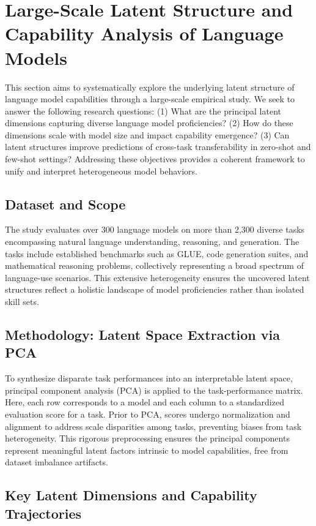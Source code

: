 \documentclass[sigconf]{acmart}
\begin{document}
\section{Large-Scale Latent Structure and Capability Analysis of Language Models}

This section aims to systematically explore the underlying latent structure of language model capabilities through a large-scale empirical study. We seek to answer the following research questions: (1) What are the principal latent dimensions capturing diverse language model proficiencies? (2) How do these dimensions scale with model size and impact capability emergence? (3) Can latent structures improve predictions of cross-task transferability in zero-shot and few-shot settings? Addressing these objectives provides a coherent framework to unify and interpret heterogeneous model behaviors.

\subsection{Dataset and Scope}

The study evaluates over 300 language models on more than 2,300 diverse tasks encompassing natural language understanding, reasoning, and generation. The tasks include established benchmarks such as GLUE, code generation suites, and mathematical reasoning problems, collectively representing a broad spectrum of language-use scenarios. This extensive heterogeneity ensures the uncovered latent structures reflect a holistic landscape of model proficiencies rather than isolated skill sets.

\subsection{Methodology: Latent Space Extraction via PCA}

To synthesize disparate task performances into an interpretable latent space, principal component analysis (PCA) is applied to the task-performance matrix. Here, each row corresponds to a model and each column to a standardized evaluation score for a task. Prior to PCA, scores undergo normalization and alignment to address scale disparities among tasks, preventing biases from task heterogeneity. This rigorous preprocessing ensures the principal components represent meaningful latent factors intrinsic to model capabilities, free from dataset imbalance artifacts.

\subsection{Key Latent Dimensions and Capability Trajectories}
\end{document}
